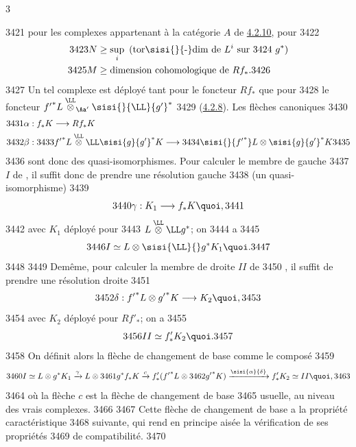 3	\documentclass[10pt]{../fichiers-configuration-latex/smfart}
\begin{document}
  3421	pour les complexes appartenant à la catégorie $A$ de \hyperref[XVII.prop4.2.10]{4.2.10}, pour
  3422	\begin{align*}
  3423	N & \geq\sup_i \text{ (tor\sisi{}{-}dim de $L^{i}$ sur
  3424	$g^{\ast}$)}\\
  3425	M & \geq\text{dimension cohomologique de $Rf_{\ast}$}.
  3426	\end{align*}
  3427	Un tel complexe est déployé tant pour le foncteur $Rf_{\ast}$ que pour
  3428	le foncteur ${f'}^{\ast}L\overset{\LL}{\otimes}_{\Aa'}\sisi{}{\LL}{g'}^{\ast}$
  3429	(\hyperref[XVII.lem4.2.8]{4.2.8}). Les flèches canoniques
  3430	\begin{align*}
  3431	\alpha &: f_{\ast}K\longrightarrow Rf_{\ast}K\\
  3432	\beta &:
  3433	{f'}^{\ast}L\overset{\LL}{\otimes}\LL \sisi{g}{{g'}}^{\ast}K\longrightarrow
  3434	\sisi{}{{f'}^*}L\otimes \sisi{g}{{g'}}^{\ast}K
  3435	\end{align*}
  3436	sont donc des quasi-isomorphismes. Pour calculer le membre de gauche
  3437	$I$ de , il suffit donc de prendre une résolution gauche
  3438	(\ie un quasi-isomorphisme)
  3439	\[
  3440	\gamma:K_{1}\longrightarrow f_{\ast}K{\quoi},
  3441	\]
  3442	avec $K_{1}$ déployé pour
  3443	$L\overset{\LL}{\otimes}\LL g^{\ast}$; on
  3444	a
  3445	\[
  3446	I\simeq L\otimes \sisi{\LL}{} g^{\ast}K_{1}{\quoi}.
  3447	\]
  3448	
  3449	De\pageoriginale même, pour calculer la membre de droite $II$ de
  3450	, il suffit de prendre une résolution droite
  3451	\[
  3452	\delta:{f'}^{\ast}L\otimes {g'}^{\ast}K\longrightarrow K_2{\quoi},
  3453	\]
  3454	avec $K_{2}$ déployé pour $Rf'_{\ast}$; on a
  3455	\[
  3456	II\simeq f'_{\ast}K_{2}{\quoi}.
  3457	\]
  3458	On définit alors la flèche de changement de base comme le composé
  3459	\[
  3460	I\simeq L\otimes g^{\ast}K_{1}\xrightarrow{\gamma}L\otimes
  3461	g^{\ast}f_{\ast}K\xrightarrow{c}f'_{\ast}({f'}^{\ast}L\otimes
  3462	{g'}^{\ast}K)\xrightarrow{\sisi{\alpha}{\delta}}f'_{\ast}K_{2}\simeq II{\quoi},
  3463	\]
  3464	où la flèche $c$ est la flèche de changement de base
  3465	usuelle, au niveau des vrais complexes.
  3466	
  3467	Cette flèche de changement de base a la propriété caractéristique
  3468	suivante, qui rend en principe aisée la vérification de ses propriétés
  3469	de compatibilité.
  3470	
\end{document}
